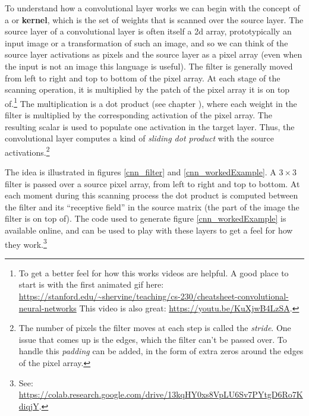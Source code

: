 To understand how a convolutional  layer works we can begin with the concept of a  or \textbf{kernel}, which is the set of weights that is scanned over the source layer. The source layer of a convolutional layer is often itself a 2d array, prototypically an input image or a transformation of such an image, and so we can think of the source layer activations as pixels and the source layer as a pixel array (even when the input is not an image this language is useful).  The filter is generally moved from left to right and top to bottom of the pixel array. At each stage of the scanning operation, it is multiplied by the patch of the pixel array it is on top of.\footnote{To get a better feel for how this works videos are  helpful. A good place  to start is with the first animated gif here: \url{https://stanford.edu/~shervine/teaching/cs-230/cheatsheet-convolutional-neural-networks} This video is also great: \url{https://youtu.be/KuXjwB4LzSA}.}  The multiplication is a dot product (see chapter ),  where each weight in the filter is multiplied by the corresponding activation of the pixel array. The resulting scalar is used to populate one activation in the target layer. Thus, the convolutional layer computes a kind of \emph{sliding dot product} with the source activations.\footnote{The number of pixels the filter moves at each step is called the \emph{stride}. One issue that comes up is the edges, which the filter can't be passed over. To handle this \emph{padding} can be added, in the form of extra zeros around the edges of the pixel array.}

The idea is illustrated in figures \ref{cnn_filter} and \ref{cnn_workedExample}. A $3 \times 3$ filter is passed over a source pixel array, from left to right and top to bottom. At each moment during this scanning process the dot product is computed between the filter and its ``receptive field'' in the source matrix (the part of the image the filter is on top of). The code used to generate figure \ref{cnn_workedExample} is available online, and can be used to play with these layers to get a feel for how they work.\footnote{See: \url{https://colab.research.google.com/drive/13kqHY0xs8VpLU6Sv7PYtgD6Ro7KdiqjY}.}

